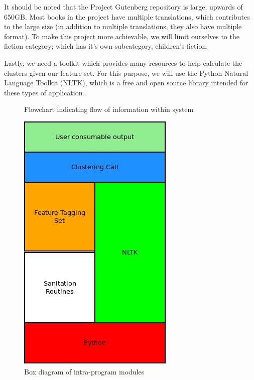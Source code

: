 \documentclass[]{article}
\begin{document}
It should be noted that the Project Gutenberg repository is large; upwards of 650GB.
Most books in the project have multiple translations, which contributes to the large size (in addition to multiple translations, they also have multiple format).
To make this project more achievable, we will limit ourselves to the fiction category; which has it's own subcategory, children's fiction.

Lastly, we need a toolkit which provides many resources to help calculate the clusters given our feature set.
For this purpose, we will use the Python Natural Language Toolkit (NLTK), which is a free and open source library intended for these types of application \cite{ref:evolution_of_jun}.





\begin{figure}
	\label{flowchart}
	\caption{Flowchart indicating flow of information within system}
	\centering
\end{figure}

\begin{figure}
	\label{boxchart}
	\caption{Box diagram of intra-program modules}
	\centering
	\includegraphics{../StackDiagram.jpg}
\end{figure}

\printbibliography
\end{document}
